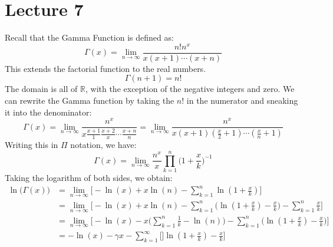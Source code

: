 \documentclass[crop=false,class=book,oneside]{standalone}
\begin{document}
    \section{Lecture 7}
        Recall that the Gamma Function is defined as:
        \begin{equation}
            \Gamma(x)=
            \underset{n\rightarrow\infty}{\lim}
                \frac{n!n^{x}}{x(x+1)\cdots(x+n)}
        \end{equation}
        This extends the factorial function to the real numbers.
        \begin{equation}
            \Gamma(n+1)=n!
        \end{equation}
        The domain is all of $\mathbb{R}$, with the exception of
        the negative integers and zero. We can rewrite the
        Gamma function by taking the $n!$ in the numerator and
        sneaking it into the denominator:
        \begin{equation}
            \Gamma(x)=
            \underset{n\rightarrow\infty}{\lim}
            \frac{n^{x}}
                 {x\frac{x+1}{1}\frac{x+2}{x}\cdots\frac{x+n}{n}}
            =\underset{n\rightarrow\infty}{\lim}
            \frac{n^{x}}
                 {x(x+1)(\frac{x}{2}+1)\cdots(\frac{x}{n}+1)}
        \end{equation}
        Writing this in $\Pi$ notation, we have:
        \begin{equation}
            \Gamma(x)=
            \underset{n\rightarrow\infty}{\lim}
            \frac{n^{x}}{x}
            \prod_{k=1}^{n}\Big(1+\frac{x}{k}\Big)^{-1}
        \end{equation}
        Taking the logarithm of both sides, we obtain:
        \begin{align}
            \ln\Big(\Gamma(x)\Big)&=
            \underset{n\rightarrow\infty}{\lim}
            \Big[
                -\ln(x)+x\ln(n)-\sum_{k=1}^{n}\ln(1+\frac{x}{k})
            \Big]\\
            &=\underset{n\rightarrow\infty}{\lim}
            \Big[
                -\ln(x)+x\ln(n)-
                \sum_{k=1}^{n}\Big(
                    \ln(1+\frac{x}{k})-\frac{x}{k}
                \Big)-\sum_{k=1}^{n}\frac{x}{k}
            \Big]\\
            &=\underset{n\rightarrow\infty}{\lim}
            \Big[-\ln(x)-x\Big(\sum_{k=1}^{n}\frac{1}{k}-\ln(n)\Big)
                 -\sum_{k=1}^{n}\Big(
                    \ln(1+\frac{x}{k})-\frac{x}{k}
                \Big)
            \Big]\\
            &=-\ln(x)-\gamma{x}-\sum_{k=1}^{\infty}\Big[]
                    \ln(1+\frac{x}{k})-\frac{x}{k}
                \Big]
        \end{align}
\end{document}
